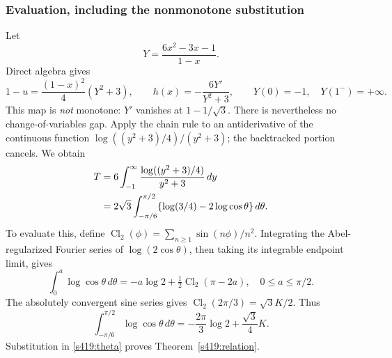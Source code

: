 \documentclass[11pt,a4paper]{article}
\theoremstyle{remark}\newtheorem{remark}[theorem]{Remark}
\numberwithin{equation}{section}
\begin{document}
\subsubsection{Evaluation, including the nonmonotone substitution}
Let
\[
 Y=\frac{6x^2-3x-1}{1-x}.
\]
Direct algebra gives
\[
 1-u=\frac{(1-x)^2}{4}(Y^2+3),\qquad
 h(x)=-\frac{6Y'}{Y^2+3},\qquad Y(0)=-1,\quad Y(1^-)=+\infty.
\]
This map is \emph{not} monotone: $Y'$ vanishes at $1-1/\sqrt3$.
There is nevertheless no change-of-variables gap. Apply the chain rule to
an antiderivative of the continuous function
$\log((y^2+3)/4)/(y^2+3)$; the backtracked portion cancels. We obtain
\begin{align}
 T&=6\int_{-1}^\infty\frac{\log((y^2+3)/4)}{y^2+3}\,dy\notag\\
 &=2\sqrt3\int_{-\pi/6}^{\pi/2}
       \{\log(3/4)-2\log\cos\theta\}\,d\theta.\label{s419:theta}
\end{align}
To evaluate this, define $\operatorname{Cl}_2(\phi)=\sum_{n\ge1}\sin(n\phi)/n^2$.
Integrating the Abel-regularized Fourier series of $\log(2\cos\theta)$,
then taking its integrable endpoint limit, gives
\[
 \int_0^a\log\cos\theta\,d\theta
 =-a\log2+\tfrac12\operatorname{Cl}_2(\pi-2a),\quad 0\le a\le\pi/2.
\]
The absolutely convergent sine series gives
$\operatorname{Cl}_2(2\pi/3)=\sqrt3 K/2$. Thus
\[
 \int_{-\pi/6}^{\pi/2}\log\cos\theta\,d\theta
 =-\frac{2\pi}3\log2+\frac{\sqrt3}4K.
\]
Substitution in \eqref{s419:theta} proves Theorem~\ref{s419:relation}.
\end{document}
